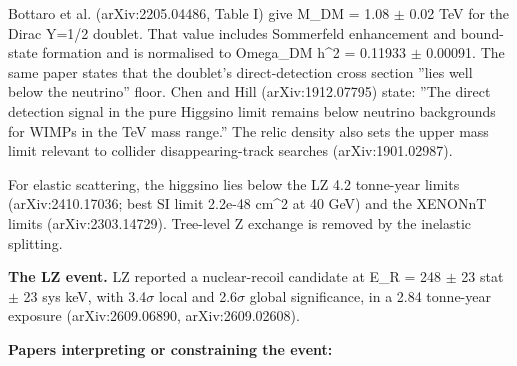 \documentclass[11pt,a4paper]{article}
\begin{document}
Bottaro et al. (arXiv:2205.04486, Table I) give M\_DM = 1.08 $\pm$ 0.02 TeV for the Dirac Y=1/2 doublet. That value includes Sommerfeld enhancement and bound-state formation and is normalised to Omega\_DM h\textasciicircum{}2 = 0.11933 $\pm$ 0.00091. The same paper states that the doublet's direct-detection cross section ''lies well below the neutrino'' floor. Chen and Hill (arXiv:1912.07795) state: ''The direct detection signal in the pure Higgsino limit remains below neutrino backgrounds for WIMPs in the TeV mass range.'' The relic density also sets the upper mass limit relevant to collider disappearing-track searches (arXiv:1901.02987).

For elastic scattering, the higgsino lies below the LZ 4.2 tonne-year limits (arXiv:2410.17036; best SI limit 2.2e-48 cm\textasciicircum{}2 at 40 GeV) and the XENONnT limits (arXiv:2303.14729). Tree-level Z exchange is removed by the inelastic splitting.

\textbf{The LZ event.} LZ reported a nuclear-recoil candidate at E\_R = 248 $\pm$ 23 stat $\pm$ 23 sys keV, with 3.4$\sigma$ local and 2.6$\sigma$ global significance, in a 2.84 tonne-year exposure (arXiv:2609.06890, arXiv:2609.02608).

\textbf{Papers interpreting or constraining the event:}
\end{document}
